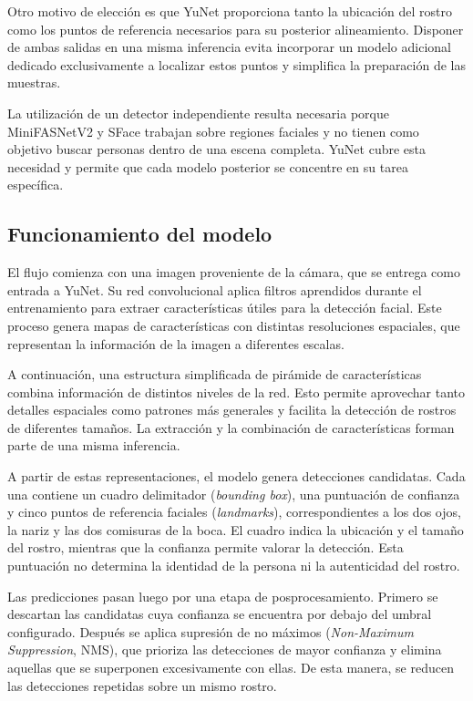 Otro motivo de elección es que YuNet proporciona tanto la ubicación del rostro como los puntos de referencia necesarios para su posterior alineamiento. Disponer de ambas salidas en una misma inferencia evita incorporar un modelo adicional dedicado exclusivamente a localizar estos puntos y simplifica la preparación de las muestras.

La utilización de un detector independiente resulta necesaria porque MiniFASNetV2 y SFace trabajan sobre regiones faciales y no tienen como objetivo buscar personas dentro de una escena completa. YuNet cubre esta necesidad y permite que cada modelo posterior se concentre en su tarea específica.

\subsection{Funcionamiento del modelo}

El flujo comienza con una imagen proveniente de la cámara, que se entrega como entrada a YuNet. Su red convolucional aplica filtros aprendidos durante el entrenamiento para extraer características útiles para la detección facial. Este proceso genera mapas de características con distintas resoluciones espaciales, que representan la información de la imagen a diferentes escalas.

A continuación, una estructura simplificada de pirámide de características combina información de distintos niveles de la red. Esto permite aprovechar tanto detalles espaciales como patrones más generales y facilita la detección de rostros de diferentes tamaños. La extracción y la combinación de características forman parte de una misma inferencia.

A partir de estas representaciones, el modelo genera detecciones candidatas. Cada una contiene un cuadro delimitador (\textit{bounding box}), una puntuación de confianza y cinco puntos de referencia faciales (\textit{landmarks}), correspondientes a los dos ojos, la nariz y las dos comisuras de la boca. El cuadro indica la ubicación y el tamaño del rostro, mientras que la confianza permite valorar la detección. Esta puntuación no determina la identidad de la persona ni la autenticidad del rostro.

Las predicciones pasan luego por una etapa de posprocesamiento. Primero se descartan las candidatas cuya confianza se encuentra por debajo del umbral configurado. Después se aplica supresión de no máximos (\textit{Non-Maximum Suppression}, NMS), que prioriza las detecciones de mayor confianza y elimina aquellas que se superponen excesivamente con ellas. De esta manera, se reducen las detecciones repetidas sobre un mismo rostro.

